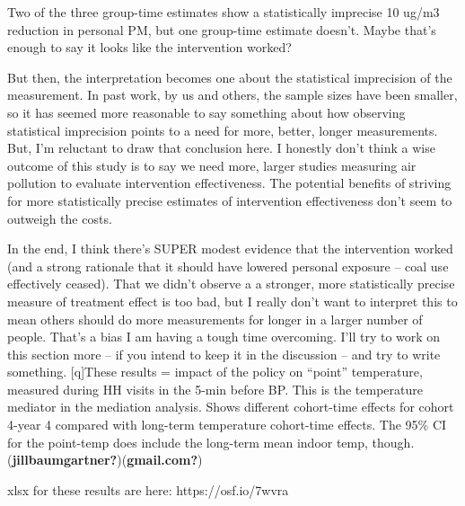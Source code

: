 \documentclass[
  letterpaper,
  DIV=11,
  numbers=noendperiod]{scrartcl}
\begin{document}
Two of the three group-time estimates show a statistically imprecise 10
ug/m3 reduction in personal PM, but one group-time estimate doesn't.
Maybe that's enough to say it looks like the intervention worked?

But then, the interpretation becomes one about the statistical
imprecision of the measurement. In past work, by us and others, the
sample sizes have been smaller, so it has seemed more reasonable to say
something about how observing statistical imprecision points to a need
for more, better, longer measurements. But, I'm reluctant to draw that
conclusion here. I honestly don't think a wise outcome of this study is
to say we need more, larger studies measuring air pollution to evaluate
intervention effectiveness. The potential benefits of striving for more
statistically precise estimates of intervention effectiveness don't seem
to outweigh the costs.

In the end, I think there's SUPER modest evidence that the intervention
worked (and a strong rationale that it should have lowered personal
exposure -- coal use effectively ceased). That we didn't observe a a
stronger, more statistically precise measure of treatment effect is too
bad, but I really don't want to interpret this to mean others should do
more measurements for longer in a larger number of people. That's a bias
I am having a tough time overcoming. I'll try to work on this section
more -- if you intend to keep it in the discussion -- and try to write
something. {[}q{]}These results = impact of the policy on ``point''
temperature, measured during HH visits in the 5-min before BP. This is
the temperature mediator in the mediation analysis. Shows different
cohort-time effects for cohort 4-year 4 compared with long-term
temperature cohort-time effects. The 95\% CI for the point-temp does
include the long-term mean indoor temp, though.
(\textbf{jillbaumgartner?})(\textbf{gmail.com?})

xlsx for these results are here: https://osf.io/7wvra
\end{document}
